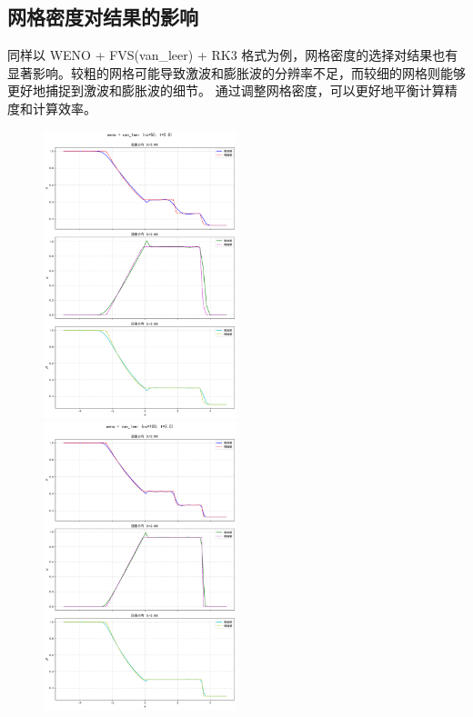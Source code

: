 \documentclass[UTF8]{ctexart}
\begin{document}
\subsection{网格密度对结果的影响}
同样以 WENO + FVS(van\_leer) + RK3 格式为例，网格密度的选择对结果也有显著影响。较粗的网格可能导致激波和膨胀波的分辨率不足，而较细的网格则能够更好地捕捉到激波和膨胀波的细节。
通过调整网格密度，可以更好地平衡计算精度和计算效率。
\begin{figure}
    \includegraphics[width=0.5\textwidth]{50.png}
    \includegraphics[width=0.5\textwidth]{100.png}\\

\end{figure}
\end{document}
